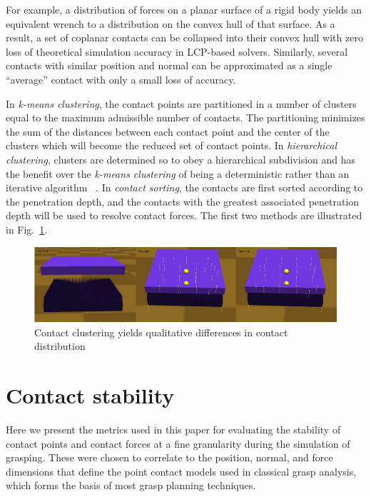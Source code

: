 For example, a distribution of forces on a planar surface of a rigid body yields an equivalent wrench to a distribution on the convex hull of that surface. As a result, a set of coplanar contacts can be collapsed into their convex hull with zero loss of theoretical simulation accuracy in LCP-based solvers.  Similarly, several contacts with similar position and normal can be approximated as a single ``average'' contact with only a small loss of accuracy.

In \emph{k-means clustering}, the contact points are partitioned in a number of clusters equal to the maximum admissible number of contacts. The partitioning minimizes the sum of the distances between each contact point and the center of the clusters which will become the reduced set of contact points.
In \emph{hierarchical clustering}, clusters are determined so to obey a hierarchical subdivision and has the benefit over the \emph{k-means clustering} of being a deterministic rather than an iterative algorithm ~\cite{Rokach10}.
In \emph{contact sorting}, the contacts are first sorted according to the penetration depth, and the contacts with the greatest associated penetration depth will be used to resolve contact forces. The first two methods are illustrated in Fig.~\ref{fig:clustering}.


\begin{figure}[!hbt]
\begin{center}
        \includegraphics[width=0.95\columnwidth]     {images/ssoch/clustering}
        \caption{Contact clustering yields qualitative differences in contact distribution}
        \label{fig:clustering}
        \end{center}
\end{figure}


\section{Contact stability}

Here we present the metrics used in this paper for evaluating the stability of contact points and contact forces at a fine granularity during the simulation of grasping.  These were chosen to correlate to the position, normal, and force dimensions that define the point contact models used in classical grasp analysis, which forms the basis of most grasp planning techniques.

